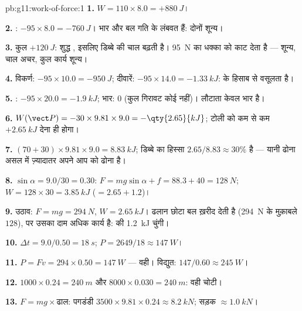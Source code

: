 \begin{solution}{pb:g11:work-of-force:1}
\textbf{1.} $W = 110 \times 8.0 = +\qty{880}{J}$।

\textbf{2.} : $-95 \times 8.0 = -\qty{760}{J}$। भार और  बल गति
के लंबवत हैं: दोनों शून्य।

\textbf{3.} कुल $+\qty{120}{J}$: शुद्ध , इसलिए डिब्बे की चाल
बढ़ती है। \qty{95}{N} का धक्का  को काट देता है ---  शून्य, चाल अचर, कुल कार्य शून्य।

\textbf{4.} विकर्ण: $-95 \times 10.0 = -\qty{950}{J}$; दीवारें: $-95 \times 14.0 = -\qty{1.33}{kJ}$:  
के हिसाब से वसूलता है।

\textbf{5.} : $-95 \times 20.0 = -\qty{1.9}{kJ}$; भार: $0$ (कुल गिरावट कोई
नहीं)। लौटाता केवल भार है।

\textbf{6.} $W(\vect P) = -30 \times 9.81 \times 9.0 =
-\qty{2.65}{kJ}$; टोली को कम से कम $+\qty{2.65}{kJ}$ देना ही होगा।

\textbf{7.} $(70 + 30) \times 9.81 \times 9.0 = \qty{8.83}{kJ}$; डिब्बे का हिस्सा $2.65/8.83 \approx 30\%$ है --- यानी ढोना असल में
ज़्यादातर अपने आप को ढोना है।

\textbf{8.} $\sin\alpha = 9.0/30 = 0.30$: $F = mg\sin\alpha + f = 88.3 + 40 = \qty{128}{N}$; $W = 128 \times 30 = \qty{3.85}{kJ}$ ($= 2.65 + 1.2$)।

\textbf{9.}  उठाव: $F = mg = \qty{294}{N}$, $W = \qty{2.65}{kJ}$। ढलान छोटा बल ख़रीद
देती है (\qty{294}{N} के मुक़ाबले $128$), पर उसका दाम अधिक कार्य है:
 की \qty{1.2}{kJ} चुंगी।

\textbf{10.} $\Delta t = 9.0/0.50 = \qty{18}{s}$; $P = 2649/18 \approx \qty{147}{W}$।

\textbf{11.} $P = Fv = 294 \times 0.50 = \qty{147}{W}$ --- वही। विद्युत: $147/0.60 \approx \qty{245}{W}$।

\textbf{12.} $1000 \times 0.24 = \qty{240}{m}$ और $8000 \times 0.030 = \qty{240}{m}$: वही चोटी।

\textbf{13.} $F = mg \times \text{ढाल}$: पगडंडी $3500 \times 9.81 \times 0.24 \approx \qty{8.2}{kN}$; सड़क $\approx \qty{1.0}{kN}$।


\end{solution}

